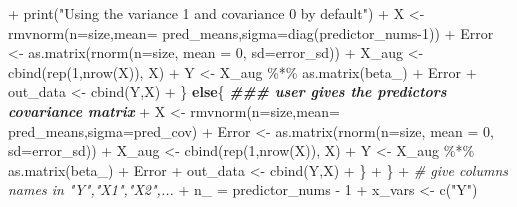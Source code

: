 \documentclass[
]{article}
\newenvironment{Shaded}{\begin{snugshade}}{\end{snugshade}}
\newcommand{\AttributeTok}[1]{\textcolor[rgb]{0.77,0.63,0.00}{#1}}
\newcommand{\CommentTok}[1]{\textcolor[rgb]{0.56,0.35,0.01}{\textit{#1}}}
\newcommand{\ControlFlowTok}[1]{\textcolor[rgb]{0.13,0.29,0.53}{\textbf{#1}}}
\newcommand{\DecValTok}[1]{\textcolor[rgb]{0.00,0.00,0.81}{#1}}
\newcommand{\DocumentationTok}[1]{\textcolor[rgb]{0.56,0.35,0.01}{\textbf{\textit{#1}}}}
\newcommand{\FunctionTok}[1]{\textcolor[rgb]{0.00,0.00,0.00}{#1}}
\newcommand{\NormalTok}[1]{#1}
\newcommand{\OtherTok}[1]{\textcolor[rgb]{0.56,0.35,0.01}{#1}}
\newcommand{\SpecialCharTok}[1]{\textcolor[rgb]{0.00,0.00,0.00}{#1}}
\newcommand{\StringTok}[1]{\textcolor[rgb]{0.31,0.60,0.02}{#1}}
\begin{document}
\begin{Shaded}
\begin{Highlighting}[]
\SpecialCharTok{+}         \FunctionTok{print}\NormalTok{(}\StringTok{"Using the variance 1 and covariance 0 by default"}\NormalTok{)}
\SpecialCharTok{+}\NormalTok{         X }\OtherTok{\textless{}{-}} \FunctionTok{rmvnorm}\NormalTok{(}\AttributeTok{n=}\NormalTok{size,}\AttributeTok{mean=}\NormalTok{ pred\_means,}\AttributeTok{sigma=}\FunctionTok{diag}\NormalTok{(predictor\_nums}\DecValTok{{-}1}\NormalTok{))}
\SpecialCharTok{+}\NormalTok{         Error }\OtherTok{\textless{}{-}} \FunctionTok{as.matrix}\NormalTok{(}\FunctionTok{rnorm}\NormalTok{(}\AttributeTok{n=}\NormalTok{size, }\AttributeTok{mean =} \DecValTok{0}\NormalTok{, }\AttributeTok{sd=}\NormalTok{error\_sd))}
\SpecialCharTok{+}\NormalTok{         X\_aug }\OtherTok{\textless{}{-}} \FunctionTok{cbind}\NormalTok{(}\FunctionTok{rep}\NormalTok{(}\DecValTok{1}\NormalTok{,}\FunctionTok{nrow}\NormalTok{(X)), X)}
\SpecialCharTok{+}\NormalTok{         Y }\OtherTok{\textless{}{-}}\NormalTok{ X\_aug }\SpecialCharTok{\%*\%} \FunctionTok{as.matrix}\NormalTok{(beta\_) }\SpecialCharTok{+}\NormalTok{ Error}
\SpecialCharTok{+}\NormalTok{         out\_data }\OtherTok{\textless{}{-}} \FunctionTok{cbind}\NormalTok{(Y,X)}
\SpecialCharTok{+}\NormalTok{       \} }\ControlFlowTok{else}\NormalTok{\{ }\DocumentationTok{\#\#\# user gives the predictors covariance matrix}
\SpecialCharTok{+}\NormalTok{         X }\OtherTok{\textless{}{-}} \FunctionTok{rmvnorm}\NormalTok{(}\AttributeTok{n=}\NormalTok{size,}\AttributeTok{mean=}\NormalTok{ pred\_means,}\AttributeTok{sigma=}\NormalTok{pred\_cov)}
\SpecialCharTok{+}\NormalTok{         Error }\OtherTok{\textless{}{-}} \FunctionTok{as.matrix}\NormalTok{(}\FunctionTok{rnorm}\NormalTok{(}\AttributeTok{n=}\NormalTok{size, }\AttributeTok{mean =} \DecValTok{0}\NormalTok{, }\AttributeTok{sd=}\NormalTok{error\_sd))}
\SpecialCharTok{+}\NormalTok{         X\_aug }\OtherTok{\textless{}{-}} \FunctionTok{cbind}\NormalTok{(}\FunctionTok{rep}\NormalTok{(}\DecValTok{1}\NormalTok{,}\FunctionTok{nrow}\NormalTok{(X)), X)}
\SpecialCharTok{+}\NormalTok{         Y }\OtherTok{\textless{}{-}}\NormalTok{ X\_aug }\SpecialCharTok{\%*\%} \FunctionTok{as.matrix}\NormalTok{(beta\_) }\SpecialCharTok{+}\NormalTok{ Error}
\SpecialCharTok{+}\NormalTok{         out\_data }\OtherTok{\textless{}{-}} \FunctionTok{cbind}\NormalTok{(Y,X)}
\SpecialCharTok{+}\NormalTok{       \}}
\SpecialCharTok{+}\NormalTok{     \}}
\SpecialCharTok{+}     \CommentTok{\# give columns names in "Y","X1","X2",...}
\SpecialCharTok{+}\NormalTok{     n\_ }\OtherTok{=}\NormalTok{ predictor\_nums }\SpecialCharTok{{-}} \DecValTok{1}
\SpecialCharTok{+}\NormalTok{     x\_vars }\OtherTok{\textless{}{-}} \FunctionTok{c}\NormalTok{(}\StringTok{"Y"}\NormalTok{)}

\end{Highlighting}
\end{Shaded}
\end{document}
